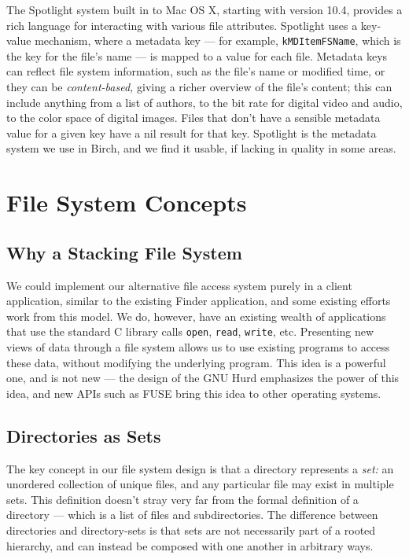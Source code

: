 \documentclass{article}
\begin{document}
The Spotlight system built in to Mac OS X, starting with version 10.4,
provides a rich language for interacting with various file
attributes. Spotlight uses a key-value mechanism, where a metadata key
--- for example, \texttt{kMDItemFSName}, which is the key for the
file's name --- is mapped to a value for each file. Metadata keys can
reflect file system information, such as the file's name or modified
time, or they can be \textit{content-based,} giving a richer overview
of the file's content; this can include anything from a list of
authors, to the bit rate for digital video and audio, to the color
space of digital images. Files that don't have a sensible metadata
value for a given key have a nil result for that key. Spotlight is the
metadata system we use in Birch, and we find it usable, if lacking in
quality in some areas.

\section{File System Concepts}

\subsection{Why a Stacking File System}

We could implement our alternative file access system purely in a
client application, similar to the existing Finder application, and
some existing efforts \cite{Gorter:2004,Nickell:2006} work from this
model. We do, however, have an existing wealth of applications that
use the standard C library calls \texttt{open}, \texttt{read},
\texttt{write}, etc. Presenting new views of data through a file
system allows us to use existing programs to access these data,
without modifying the underlying program. This idea is a powerful one,
and is not new --- the design of the GNU Hurd \cite{Bushnell:1994}
emphasizes the power of this idea, and new APIs such as FUSE
\cite{Szeredi:2006} bring this idea to other operating systems.

\subsection{Directories as Sets}

The key concept in our file system design is that a directory
represents a \emph{set:} an unordered collection of unique files, and
any particular file may exist in multiple sets. This definition
doesn't stray very far from the formal definition of a directory ---
which is a list of files and subdirectories. The difference between
directories and directory-sets is that sets are not necessarily part
of a rooted hierarchy, and can instead be composed with one another in
arbitrary ways.
\end{document}
